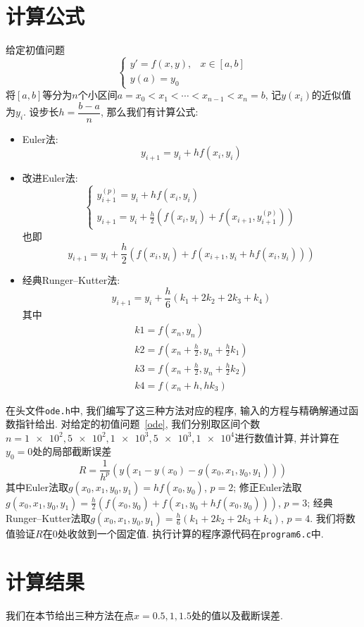 \documentclass[a4paper]{article}
\theoremstyle{plain}
\theoremstyle{remark}
\numberwithin{equation}{section}
\begin{document}
\section{计算公式}
给定初值问题
\[\begin{cases}
    y'=f(x,y),& x\in[a,b]\\
    y(a)=y_0
\end{cases}\]
将$[a,b]$等分为$n$个小区间$a=x_0<x_1<\cdots<x_{n-1}<x_n=b$, 记$y(x_i)$的近似值为$y_i$.
设步长$h=\dfrac{b-a}{n}$, 那么我们有计算公式:
\begin{itemize}
    \item Euler法:
    \[y_{i+1}=y_i+hf(x_i,y_i)\]
    \item 改进Euler法:
    \[\begin{cases}
        y_{i+1}^{(p)}=y_i+hf(x_i,y_i)\\
        y_{i+1}=y_i+\frac{h}{2}(f(x_i,y_i)+f(x_{i+1},y_{i+1}^{(p)}))
    \end{cases}\]
    也即
    \[y_{i+1}=y_i+\frac{h}{2}(f(x_i,y_i)+f(x_{i+1},y_i+hf(x_i,y_i)))\]
    \item 经典Runger--Kutter法:
    \[y_{i+1}=y_i+\frac{h}{6}(k_1+2k_2+2k_3+k_4)\]
    其中
    \[\begin{array}{l}
        k1=f(x_n,y_n)\\
        k2=f\left(x_n+\frac{h}{2},y_n+\frac{h}{2}k_1\right)\\
        k3=f\left(x_n+\frac{h}{2},y_n+\frac{h}{2}k_2\right)\\
        k4=f(x_n+h,hk_3)
    \end{array}\]
\end{itemize}

在头文件\verb|ode.h|中, 我们编写了这三种方法对应的程序, 输入的方程与精确解通过函数指针给出.
对给定的初值问题~\eqref{ode}, 我们分别取区间个数$n=\num{1e2},\num{5e2},\num{1e3},\num{5e3},\num{1e4}$进行数值计算, 并计算在$y_0=0$处的局部截断误差
\[R=\frac{1}{h^p}(y(x_{1}-y(x_0)-g(x_0,x_1,y_0,y_1)))\]
其中Euler法取$g(x_0,x_1,y_0,y_1)=hf(x_0,y_0)$, $p=2$;
修正Euler法取$g(x_0,x_1,y_0,y_1)=\frac{h}{2}(f(x_0,y_0)+f(x_{1},y_0+hf(x_0,y_0)))$, $p=3$;
经典Runger--Kutter法取$g(x_0,x_1,y_0,y_1)=\frac{h}{6}(k_1+2k_2+2k_3+k_4)$, $p=4$.
我们将数值验证$R$在$0$处收敛到一个固定值.
执行计算的程序源代码在\verb|program6.c|中.

\section{计算结果}

我们在本节给出三种方法在点$x=0.5,1,1.5$处的值以及截断误差.
\end{document}
